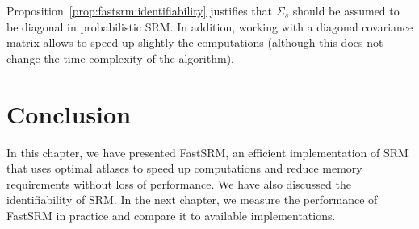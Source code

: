 Proposition~\eqref{prop:fastsrm:identifiability} justifies that
$\Sigma_s$ should be assumed to be diagonal in probabilistic SRM.
In addition, working with a diagonal covariance matrix allows to speed up
slightly the computations (although this does not change the time complexity of
the algorithm).

\section{Conclusion}
In this chapter, we have presented FastSRM, an efficient implementation of SRM
that uses optimal atlases to speed up computations and reduce memory requirements
without loss of performance. We have also discussed the identifiability of SRM.
In the next chapter, we measure the performance of FastSRM in practice and
compare it to available implementations.
